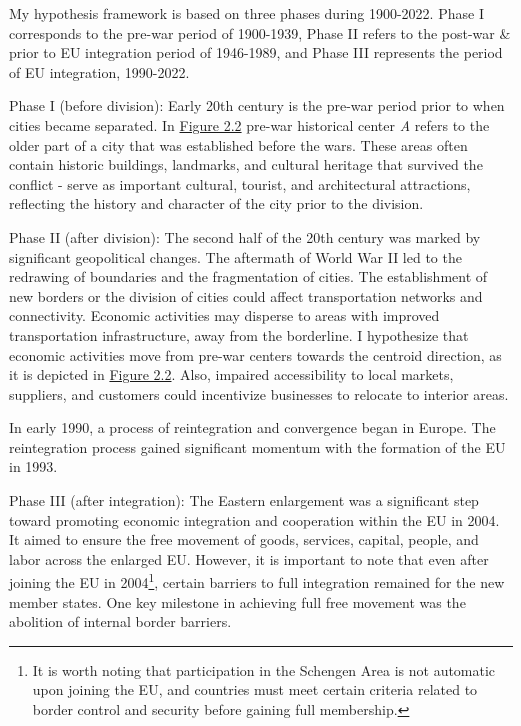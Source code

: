 \documentclass[12pt]{article}    %
\begin{document}
\par My hypothesis framework is based on three phases during 1900-2022. Phase I corresponds to the pre-war period of 1900-1939, Phase II refers to the post-war \& prior to EU integration period of 1946-1989, and Phase III represents the period of EU integration, 1990-2022. 

\par Phase I (before division): Early 20th century is the pre-war period prior to when cities became separated. In \hyperlink{Figure 2.2}{Figure 2.2} pre-war historical center \textit{A} refers to the older part of a city that was established before the wars. These areas often contain historic buildings, landmarks, and cultural heritage that survived the conflict - serve as important cultural, tourist, and architectural attractions, reflecting the history and character of the city prior to the division.

\par Phase II (after division): The second half of the 20th century was marked by significant geopolitical changes. The aftermath of World War II led to the redrawing of boundaries and the fragmentation of cities. 
The establishment of new borders or the division of cities could affect transportation networks and connectivity. Economic activities may disperse to areas with improved transportation infrastructure, away from the borderline. I hypothesize that economic activities move from pre-war centers towards the centroid direction, as it is depicted in \hyperlink{Figure 2.2}{Figure 2.2}. Also, impaired accessibility to local markets, suppliers, and customers could incentivize businesses to relocate to interior areas. 

\par In early 1990, a process of reintegration and convergence began in Europe. The reintegration process gained significant momentum with the formation of the EU in 1993. 

\par Phase III (after integration): 
The Eastern enlargement was a significant step toward promoting economic integration and cooperation within the EU in 2004. It aimed to ensure the free movement of goods, services, capital, people, and labor across the enlarged EU. However, it is important to note that even after joining the EU in 2004\footnote{It is worth noting that participation in the Schengen Area is not automatic upon joining the EU, and countries must meet certain criteria related to border control and security before gaining full membership.}, certain barriers to full integration remained for the new member states. One key milestone in achieving full free movement was the abolition of internal border barriers. 
\end{document}

